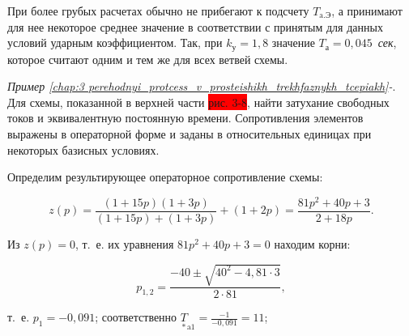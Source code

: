 При более грубых расчетах обычно не прибегают к подсчету $ T_{\text{a.Э}} $, а принимают для нее некоторое среднее значение в соответствии с принятым для данных условий ударным коэффициентом. Так, при $ k_{\text{у}} = 1,8 $ значение $ T_{\text{а}} = 0,045 $~\textit{сек}, которое считают одним и тем же для всех ветвей схемы.

\setcounter{example}{1}

\begin{small} %
	
	\vspace{1pc}
	\textit{Пример \ref*{chap:3 perehodnyi_protcess_v_prosteishikh_trekhfaznykh_tcepiakh}-}.
	Для схемы, показанной в верхней части \colorbox{red}{рис. 3-8}, найти затухание свободных токов и эквивалентную постоянную времени. Сопротивления элементов выражены в операторной форме и	заданы в относительных единицах при некоторых базисных условиях.
	
	Определим результирующее операторное сопротивление схемы:
	
	\begin{equation*}
		z(p) = \frac{(1+15p)(1+3p)}{(1+15p)+(1+3p)} + (1+2p) = \frac{81p^2+40p+3}{2+18p}.
	\end{equation*}
	
	Из $ z(p) = 0 $, т.~е. их уравнения $ 81p^2+40p+3 = 0 $ находим корни:
	
	\begin{equation*}
		p_{1,2} = \frac{-40 \pm \sqrt{40^2 - 4,81 \cdot 3}}{2 \cdot 81},
	\end{equation*}
	
	т.~е. $	p_1 = -0,091  $; соответственно $ \underset{*}{T}_{\text{a1}} = \frac{-1}{-0,091} = 11 $;
	
	
	
	\vspace{1pc}	
	
\end{small}	

